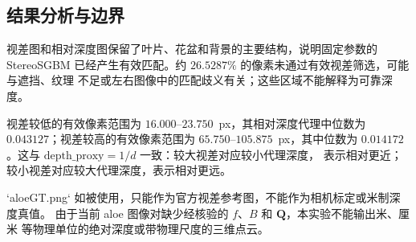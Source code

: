 \subsection{结果分析与边界}

视差图和相对深度图保留了叶片、花盆和背景的主要结构，说明固定参数的 StereoSGBM
已经产生有效匹配。约 $26.5287\%$ 的像素未通过有效视差筛选，可能与遮挡、纹理
不足或左右图像中的匹配歧义有关；这些区域不能解释为可靠深度。

视差较低的有效像素范围为 $16.000$--$23.750$~px，其相对深度代理中位数为
$0.043127$；视差较高的有效像素范围为 $65.750$--$105.875$~px，其中位数为
$0.014172$。这与 $\mathrm{depth\_proxy}=1/d$ 一致：较大视差对应较小代理深度，
表示相对更近；较小视差对应较大代理深度，表示相对更远。

`aloeGT.png` 如被使用，只能作为官方视差参考图，不能作为相机标定或米制深度真值。
由于当前 aloe 图像对缺少经核验的 $f$、$B$ 和 $\mathbf{Q}$，本实验不能输出米、厘米
等物理单位的绝对深度或带物理尺度的三维点云。
